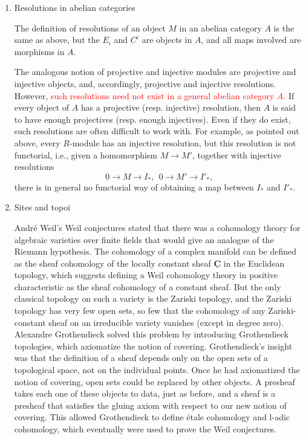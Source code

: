 \documentclass[UTF8]{ctexart}
\begin{document}
\begin{enumerate}
\item Resolutions in abelian categories\parencite{resolutions_in_abelian_categories}

The definition of resolutions of an object $M$ in an abelian category $A$ is the same as above, but the $E_i$ and $C^i$ are objects in $A$, and all maps involved are morphisms in $A$.

The analogous notion of projective and injective modules are projective and injective objects, and, accordingly, projective and injective resolutions. However, \textcolor{red}{such resolutions need not exist in a general abelian category $A$.} If every object of $A$ has a projective (resp. injective) resolution, then $A$ is said to have enough projectives (resp. enough injectives). Even if they do exist, such resolutions are often difficult to work with. For example, as pointed out above, every $R$-module has an injective resolution, but this resolution is not functorial, i.e., given a homomorphism $M \to M'$, together with injective resolutions
\[
0\rightarrow M\rightarrow I_{*},\ \ 0\rightarrow M'\rightarrow I'_{*},
\]
there is in general no functorial way of obtaining a map between $I_{*}$ and $I'_{*}$.

\item Sites and topoi\parencite{sites_and_topoi}

André Weil's Weil conjectures stated that there was a cohomology theory for algebraic varieties over finite fields that would give an analogue of the Riemann hypothesis. The cohomology of a complex manifold can be defined as the sheaf cohomology of the locally constant sheaf $\underline{\mathbf {C} }$ in the Euclidean topology, which suggests defining a Weil cohomology theory in positive characteristic as the sheaf cohomology of a constant sheaf. But the only classical topology on such a variety is the Zariski topology, and the Zariski topology has very few open sets, so few that the cohomology of any Zariski-constant sheaf on an irreducible variety vanishes (except in degree zero). Alexandre Grothendieck solved this problem by introducing Grothendieck topologies, which axiomatize the notion of covering. Grothendieck's insight was that the definition of a sheaf depends only on the open sets of a topological space, not on the individual points. Once he had axiomatized the notion of covering, open sets could be replaced by other objects. A presheaf takes each one of these objects to data, just as before, and a sheaf is a presheaf that satisfies the gluing axiom with respect to our new notion of covering. This allowed Grothendieck to define étale cohomology and l-adic cohomology, which eventually were used to prove the Weil conjectures.


\end{enumerate}
\end{document}
